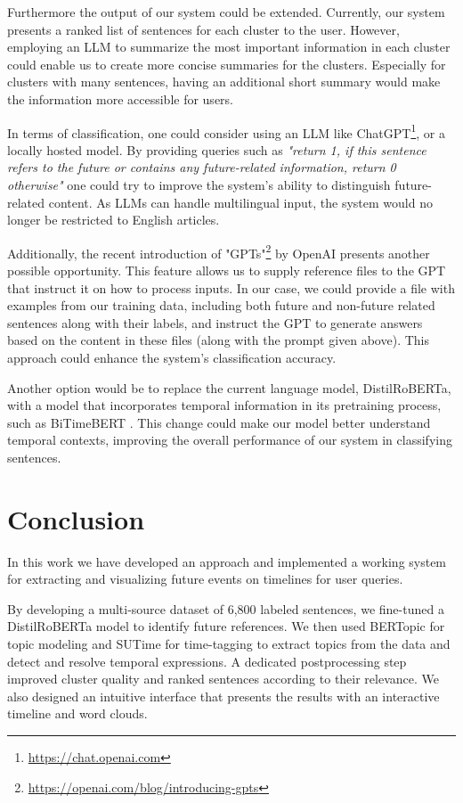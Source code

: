 \documentclass[12pt,oneside,bibtotoc,liststotoc]{scrbook}
\begin{document}
Furthermore the output of our system could be extended. Currently, our system presents a ranked list of sentences for each cluster to the user. However, employing an LLM to summarize the most important information in each cluster could enable us to create more concise summaries for the clusters. Especially for clusters with many sentences, having an additional short summary would make the information more accessible for users.

In terms of classification, one could consider using an LLM like ChatGPT\footnote{\url{https://chat.openai.com}}, or a locally hosted model. By providing queries such as \textit{"return 1, if this sentence refers to the future or contains any future-related information, return 0 otherwise"} one could try to improve the system's ability to distinguish future-related content. As LLMs can handle multilingual input, the system would no longer be restricted to English articles.

Additionally, the recent introduction of "GPTs"\footnote{\url{https://openai.com/blog/introducing-gpts}} by OpenAI presents another possible opportunity. This feature allows us to supply reference files to the GPT that instruct it on how to process inputs. In our case, we could provide a file with examples from our training data, including both future and non-future related sentences along with their labels, and instruct the GPT to generate answers based on the content in these files (along with the prompt given above). This approach could enhance the system's classification accuracy.

Another option would be to replace the current language model, DistilRoBERTa, with a model that incorporates temporal information in its pretraining process, such as BiTimeBERT \cite{JatowtBitimeBert}. This change could make our model better understand temporal contexts, improving the overall performance of our system in classifying sentences.


\chapter{Conclusion}
In this work we have developed an approach and implemented a working system for extracting and visualizing future events on timelines for user queries.

By developing a multi-source dataset of 6,800 labeled sentences, we fine-tuned a DistilRoBERTa model to identify future references. We then used BERTopic for topic modeling and SUTime for time-tagging to extract topics from the data and detect and resolve temporal expressions. A dedicated postprocessing step improved cluster quality and ranked sentences according to their relevance. We also designed an intuitive interface that presents the results with an interactive timeline and word clouds.
\end{document}
